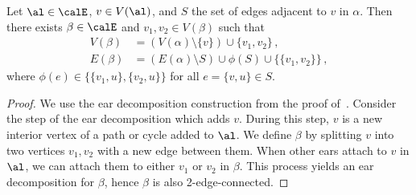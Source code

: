 \begin{lemma}
    \label{lem:new-2ec-construction}
    Let $\al\in\calE$, $v \in V(\al)$, and
    $S$ the set of edges adjacent to $v$ in
    $\alpha$.
    Then there exists $\beta\in\calE$ and $v_1, v_2 \in V(\beta)$ such that
    \begin{align*}
        V(\beta) &= (V(\alpha)\setminus \{v\}) \cup \{v_1, v_2\}\,,\\
        E(\beta) &= (E(\alpha)\setminus S)\cup \phi(S)\cup \{\{v_1, v_2\}\}\,,
    \end{align*}
    where $\phi(e)\in \{\{v_1, u\}, \{v_2, u\}\}$ for all $e=\{v,u\}\in S$.
\end{lemma}

\begin{proof}
    We use the ear decomposition construction
    from the proof of~.
    Consider the step of the ear decomposition which adds $v$. During this step, $v$ is a new interior vertex of a path or cycle added to $\al$.
    We define $\beta$ by splitting $v$ into two vertices $v_1, v_2$ with a new edge between them.
    When other ears attach to $v$ in $\al$, we can attach them to either $v_1$ or $v_2$ in $\beta$.
    This process yields an ear decomposition for $\beta$, hence $\beta$ is also 2-edge-connected.
\end{proof}

